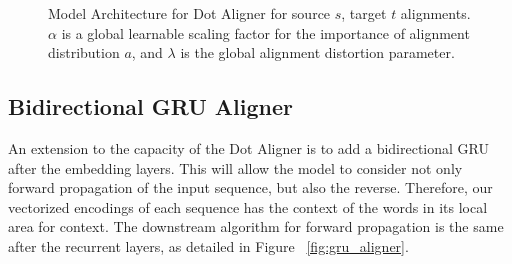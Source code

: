 \documentclass[twoside,twocolumn]{article}
\begin{document}
\begin{figure}
  \centering
  \caption{Model Architecture for Dot Aligner for source $s$,
  target $t$ alignments. $\alpha$ is a global learnable scaling factor for
  the importance of alignment distribution $a$, and $\lambda$ is the
  global alignment distortion parameter.}
  \label{fig:dot_aligner}
\end{figure}

\subsection{Bidirectional GRU Aligner}

An extension to the capacity of the Dot Aligner is to add a bidirectional GRU
after the embedding layers. This will allow the model to consider not only
forward propagation of the input sequence, but also the reverse. Therefore, our
vectorized encodings of each sequence has the context of the words in its local
area for context. The downstream algorithm for forward propagation is the same
after the recurrent layers, as detailed in Figure ~\ref{fig:gru_aligner}.
\end{document}
